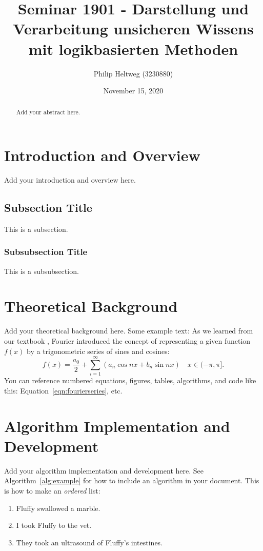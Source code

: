 \documentclass{article}
\title{Seminar 1901 - Darstellung und Verarbeitung unsicheren Wissens mit logikbasierten Methoden}
\author{Philip Heltweg (3230880)}
\date{November 15, 2020}
\begin{document}
\maketitle

\begin{abstract}
    Add your abstract here.
\end{abstract}

\section{Introduction and Overview}
Add your introduction and overview here.

\subsection{Subsection Title}
This is a subsection.

\subsubsection{Subsubsection Title}
This is a subsubsection.

\section{Theoretical Background}
Add your theoretical background here. Some example text: As we learned from our textbook \cite{kutz_2013}, Fourier introduced the concept of representing a given function $f(x)$ by a trigonometric series of sines and cosines:
\begin{equation}
    f(x) = \frac{a_0}{2} + \sum_{i=1}^\infty \left(a_n\cos{nx} + b_n\sin{nx}\right) \quad x \in (-\pi,\pi].
    \label{eqn:fourierseries}
\end{equation}
You can reference numbered equations, figures, tables, algorithms, and code like this: Equation~\ref{eqn:fourierseries}, etc.

\section{Algorithm Implementation and Development}
Add your algorithm implementation and development here. See Algorithm~\ref{alg:example} for how to include an algorithm in your document. This is how to make an \textit{ordered} list:
\begin{enumerate}
    \item Fluffy swallowed a marble.
    \item I took Fluffy to the vet.
    \item They took an ultrasound of Fluffy's intestines.
\end{enumerate}
\end{document}
